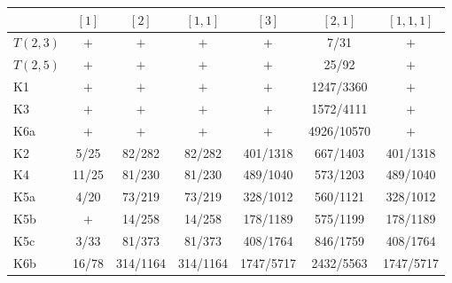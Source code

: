 \begin{tabular}{lcccccc}
\toprule
 & $[1]$ & $[2]$ & $[1,1]$ & $[3]$ & $[2,1]$ & $[1,1,1]$ \\
\midrule
$T(2,3)$ & $+$ & $+$ & $+$ & $+$ & 7/31 & $+$ \\
$T(2,5)$ & $+$ & $+$ & $+$ & $+$ & 25/92 & $+$ \\
K1 & $+$ & $+$ & $+$ & $+$ & 1247/3360 & $+$ \\
K3 & $+$ & $+$ & $+$ & $+$ & 1572/4111 & $+$ \\
K6a & $+$ & $+$ & $+$ & $+$ & 4926/10570 & $+$ \\
K2 & 5/25 & 82/282 & 82/282 & 401/1318 & 667/1403 & 401/1318 \\
K4 & 11/25 & 81/230 & 81/230 & 489/1040 & 573/1203 & 489/1040 \\
K5a & 4/20 & 73/219 & 73/219 & 328/1012 & 560/1121 & 328/1012 \\
K5b & $+$ & 14/258 & 14/258 & 178/1189 & 575/1199 & 178/1189 \\
K5c & 3/33 & 81/373 & 81/373 & 408/1764 & 846/1759 & 408/1764 \\
K6b & 16/78 & 314/1164 & 314/1164 & 1747/5717 & 2432/5563 & 1747/5717 \\
\bottomrule
\end{tabular}
